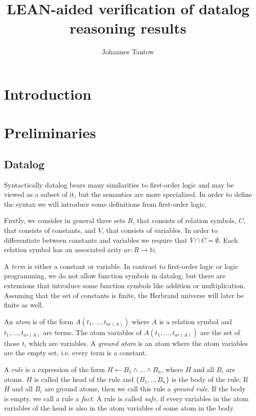 \documentclass{article}
\title{LEAN-aided verification of datalog reasoning results}
\author{Johannes Tantow}
\begin{document}
    \maketitle
    \section{Introduction}
    \section{Preliminaries}
    \subsection{Datalog}
        Syntactically datalog bears many similarities to first-order logic and may be viewed as a subset of it, but the semantics are more specialized. In order to define the syntax we will introduce some definitions from first-order logic.

        Firstly, we consider in general three sets $R$, that consists of relation symbols, $C$, that consists of constants, and $V$, that consists of variables. In order to differentiate between constants and variables we require that $V \cap C  = \emptyset$. Each relation symbol has an associated arity $ar: R \to \mathbb{N}$.
        
        A \textit{term} is either a constant or variable. In contrast to first-order logic or logic programming, we do not allow function symbols in datalog, but there are extensions that introduce some function symbols like addition or multiplication. Assuming that the set of constants is finite, the Herbrand universe will later be finite as well.

        An \textit{atom} is of the form $A(t_1, ..., t_{ar(A)})$ where $A$ is a relation symbol and $t_1,..., t_{ar(A)}$ are terms. The atom variables of $A(t_1, ..., t_{ar(A)})$ are the set of those $t_i$ which are variables. A \textit{ground atom} is an atom where the atom variables are the empty set, i.e. every term is a constant.
        
        A \textit{rule} is a expression of the form $H \leftarrow B_1 \land ... \land B_n$, where $H$ and all $B_i$ are atoms. $H$ is called the head of the rule and $\{B_1,.., B_n\}$ is the body of the rule. If $H$ and all $B_i$ are ground atoms, then we call this rule a \textit{ground rule}. If the body is empty, we call a rule a \textit{fact}. A rule is called \textit{safe}, if every variables in the atom variables of the head is also in the atom variables of some atom in the body. 
\end{document}

